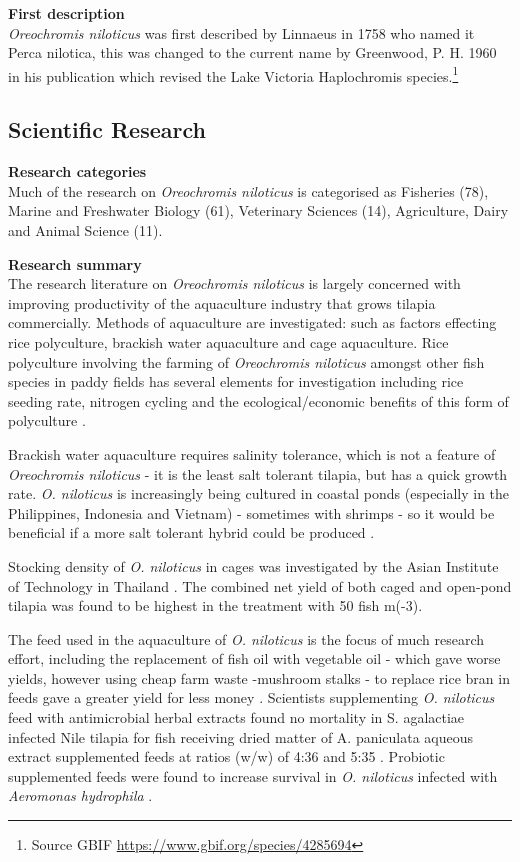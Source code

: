 \documentclass[openany]{book}
\let\rmarkdownfootnote\footnote%
\def\footnote{\protect\rmarkdownfootnote}
\theoremstyle{definition}
\theoremstyle{definition}
\theoremstyle{definition}
\theoremstyle{remark}
\begin{document}
\textbf{First description}\\
\emph{Oreochromis niloticus} was first described by Linnaeus in 1758 who
named it Perca nilotica, this was changed to the current name by
Greenwood, P. H. 1960 in his publication which revised the Lake Victoria
Haplochromis species.\footnote{Source GBIF
  \url{https://www.gbif.org/species/4285694}}

\hypertarget{scientific-research-5}{%
\subsection{Scientific Research}\label{scientific-research-5}}

\textbf{Research categories}\\
Much of the research on \emph{Oreochromis niloticus} is categorised as
Fisheries (78), Marine and Freshwater Biology (61), Veterinary Sciences
(14), Agriculture, Dairy and Animal Science (11).

\textbf{Research summary}\\
The research literature on \emph{Oreochromis niloticus} is largely
concerned with improving productivity of the aquaculture industry that
grows tilapia commercially. Methods of aquaculture are investigated:
such as factors effecting rice polyculture, brackish water aquaculture
and cage aquaculture. Rice polyculture involving the farming of
\emph{Oreochromis niloticus} amongst other fish species in paddy fields
has several elements for investigation including rice seeding rate,
nitrogen cycling and the ecological/economic benefits of this form of
polyculture \citep{Vromant_2002, Rothuis_1999, Oehme_2007}.

Brackish water aquaculture requires salinity tolerance, which is not a
feature of \emph{Oreochromis niloticus} - it is the least salt tolerant
tilapia, but has a quick growth rate. \emph{O. niloticus} is
increasingly being cultured in coastal ponds (especially in the
Philippines, Indonesia and Vietnam) - sometimes with shrimps - so it
would be beneficial if a more salt tolerant hybrid could be produced
\citep{Kamal_2005}.

Stocking density of \emph{O. niloticus} in cages was investigated by the
Asian Institute of Technology in Thailand \citep{Yi_1996}. The combined
net yield of both caged and open-pond tilapia was found to be highest in
the treatment with 50 fish m(-3).

The feed used in the aquaculture of \emph{O. niloticus} is the focus of
much research effort, including the replacement of fish oil with
vegetable oil - which gave worse yields, however using cheap farm waste
-mushroom stalks - to replace rice bran in feeds gave a greater yield
for less money \citep{Karapanagiotidis_2007, Afsharnasab_2015}.
Scientists supplementing \emph{O. niloticus} feed with antimicrobial
herbal extracts found no mortality in S. agalactiae infected Nile
tilapia for fish receiving dried matter of A. paniculata aqueous extract
supplemented feeds at ratios (w/w) of 4:36 and 5:35
\citep{Rattanachaikunsopon_2009}. Probiotic supplemented feeds were
found to increase survival in \emph{O. niloticus} infected with
\emph{Aeromonas hydrophila} \citep{Kaew-on_2016}.
\end{document}
